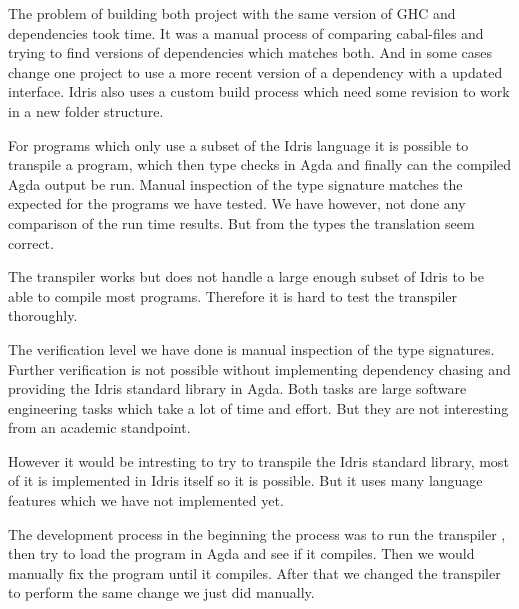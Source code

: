 
The problem of building both project with the same version of GHC and
dependencies took time. It was a manual process of comparing cabal-files and
trying to find versions of dependencies which matches both. And in some cases
change one project to use a more recent version of a dependency with a updated
interface. Idris also uses a custom build process which need some revision to
work in a new folder structure.


For programs which only use a subset of the Idris
language it is possible to transpile a program, which then type checks in Agda
and finally can the compiled Agda output be run. Manual inspection of the type
signature matches the expected for the programs we have tested. We have
however, not done any comparison of the run time results. But from the types
the translation seem correct.

The transpiler works but does not handle a large enough subset of Idris to be
able to compile most programs. Therefore it is hard to test the
transpiler thoroughly.


The verification level we have done is manual inspection of the type
signatures. Further verification is not possible without implementing
dependency chasing and providing the Idris standard library in Agda. Both tasks
are large software engineering tasks which take a lot of time and effort. But
they are not interesting from an academic standpoint.

However it would be intresting to try to transpile the Idris standard library,
most of it is implemented in Idris itself so it is possible. But it uses many
language features which we have not implemented yet.

The development process in the beginning the process was to run the transpiler
, then try to load the program in Agda and see if it compiles.  Then we would
manually fix the program until it compiles.  After that we changed the
transpiler to perform the same change we just did manually.

